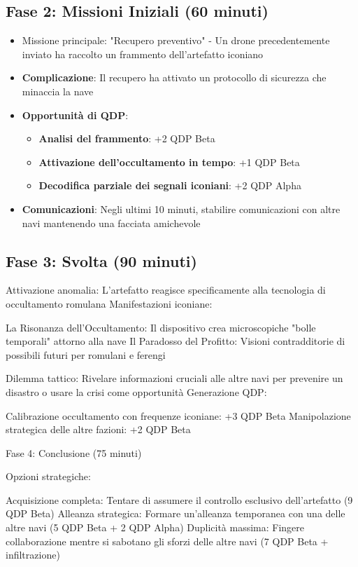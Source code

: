 \documentclass[letterpaper,twocolumn,openany,nodeprecatedcode]{dndbook}
\begin{document}
\subsection{Fase 2: Missioni Iniziali (60 minuti)}

\begin{itemize}
    \item Missione principale: "Recupero preventivo" - Un drone precedentemente inviato ha raccolto un frammento dell'artefatto iconiano
    \item \textbf{Complicazione}: Il recupero ha attivato un protocollo di sicurezza che minaccia la nave
    \item \textbf{Opportunità di QDP}:
    \begin{itemize}
    \item \textbf{Analisi del frammento}: +2 QDP Beta
    \item \textbf{Attivazione dell'occultamento in tempo}: +1 QDP Beta
    \item \textbf{Decodifica parziale dei segnali iconiani}: +2 QDP Alpha
    \end{itemize}
    \item \textbf{Comunicazioni}: Negli ultimi 10 minuti, stabilire comunicazioni con altre navi mantenendo una facciata amichevole
\end{itemize}

\subsection{Fase 3: Svolta (90 minuti)}

Attivazione anomalia: L'artefatto reagisce specificamente alla tecnologia di occultamento romulana
Manifestazioni iconiane:

La Risonanza dell'Occultamento: Il dispositivo crea microscopiche "bolle temporali" attorno alla nave
Il Paradosso del Profitto: Visioni contradditorie di possibili futuri per romulani e ferengi


Dilemma tattico: Rivelare informazioni cruciali alle altre navi per prevenire un disastro o usare la crisi come opportunità
Generazione QDP:

Calibrazione occultamento con frequenze iconiane: +3 QDP Beta
Manipolazione strategica delle altre fazioni: +2 QDP Beta



Fase 4: Conclusione (75 minuti)

Opzioni strategiche:

Acquisizione completa: Tentare di assumere il controllo esclusivo dell'artefatto (9 QDP Beta)
Alleanza strategica: Formare un'alleanza temporanea con una delle altre navi (5 QDP Beta + 2 QDP Alpha)
Duplicità massima: Fingere collaborazione mentre si sabotano gli sforzi delle altre navi (7 QDP Beta + infiltrazione)
\end{document}
